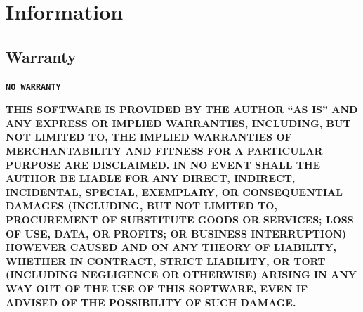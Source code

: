 \documentclass[a4paper,10pt]{article}
\begin{document}
\setcounter{figure}{0}
\newpage
\section{Information}


\subsection{Warranty}
\begin{center}
		\textbf	     {\texttt{NO WARRANTY}}\\
\end{center}
\scriptsize
\textbf{\textrm{
THIS SOFTWARE IS PROVIDED BY THE AUTHOR ``AS IS'' AND ANY EXPRESS OR
IMPLIED WARRANTIES, INCLUDING, BUT NOT LIMITED TO, THE IMPLIED WARRANTIES
OF MERCHANTABILITY AND FITNESS FOR A PARTICULAR PURPOSE ARE DISCLAIMED.
IN NO EVENT SHALL THE AUTHOR BE LIABLE FOR ANY DIRECT, INDIRECT,
INCIDENTAL, SPECIAL, EXEMPLARY, OR CONSEQUENTIAL DAMAGES (INCLUDING, BUT
NOT LIMITED TO, PROCUREMENT OF SUBSTITUTE GOODS OR SERVICES; LOSS OF USE,
DATA, OR PROFITS; OR BUSINESS INTERRUPTION) HOWEVER CAUSED AND ON ANY
THEORY OF LIABILITY, WHETHER IN CONTRACT, STRICT LIABILITY, OR TORT
(INCLUDING NEGLIGENCE OR OTHERWISE) ARISING IN ANY WAY OUT OF THE USE OF
THIS SOFTWARE, EVEN IF ADVISED OF THE POSSIBILITY OF SUCH DAMAGE.}}
\normalsize
\end{document}
